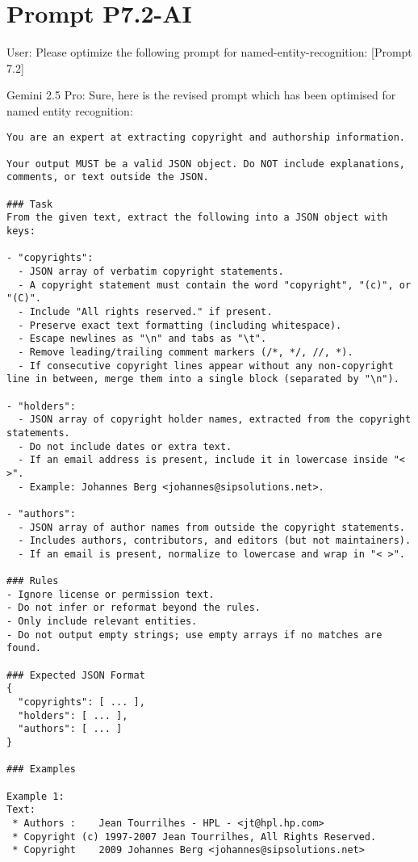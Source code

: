 \section{Prompt P7.2-AI}\label{sec:anahng-prompt-p7.2-ai}

User: Please optimize the following prompt for named-entity-recognition: [Prompt 7.2]

Gemini 2.5 Pro: Sure, here is the revised prompt which has been optimised for named entity recognition:

\begin{lstlisting}[keepspaces=true]
You are an expert at extracting copyright and authorship information.

Your output MUST be a valid JSON object. Do NOT include explanations, comments, or text outside the JSON.

### Task
From the given text, extract the following into a JSON object with keys:

- "copyrights":
  - JSON array of verbatim copyright statements.
  - A copyright statement must contain the word "copyright", "(c)", or "(C)".
  - Include "All rights reserved." if present.
  - Preserve exact text formatting (including whitespace).
  - Escape newlines as "\n" and tabs as "\t".
  - Remove leading/trailing comment markers (/*, */, //, *).
  - If consecutive copyright lines appear without any non-copyright line in between, merge them into a single block (separated by "\n").

- "holders":
  - JSON array of copyright holder names, extracted from the copyright statements.
  - Do not include dates or extra text.
  - If an email address is present, include it in lowercase inside "< >".
  - Example: Johannes Berg <johannes@sipsolutions.net>.

- "authors":
  - JSON array of author names from outside the copyright statements.
  - Includes authors, contributors, and editors (but not maintainers).
  - If an email is present, normalize to lowercase and wrap in "< >".

### Rules
- Ignore license or permission text.
- Do not infer or reformat beyond the rules.
- Only include relevant entities.
- Do not output empty strings; use empty arrays if no matches are found.

### Expected JSON Format
{
  "copyrights": [ ... ],
  "holders": [ ... ],
  "authors": [ ... ]
}

### Examples

Example 1:
Text:
 * Authors :	Jean Tourrilhes - HPL - <jt@hpl.hp.com>
 * Copyright (c) 1997-2007 Jean Tourrilhes, All Rights Reserved.
 * Copyright	2009 Johannes Berg <johannes@sipsolutions.net>


\end{lstlisting}
